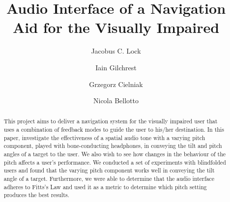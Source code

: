 \documentclass[format=sigconf, review=true, screen=true, anonymous=true]{acmart}
\begin{document}

\title[Audio Interface for the Visually Impaired]{Audio Interface of a Navigation Aid for the Visually Impaired}

\author{Jacobus C. Lock}

\author{Iain Gilchrest}

\author{Grzegorz Cielniak}

\author{Nicola Bellotto}




\begin{abstract}
  This project aims to deliver a navigation system for the visually impaired user that uses a combination of feedback modes to guide the user to his/her destination. In this paper, investigate the effectiveness of a spatial audio tone with a varying pitch component, played with bone-conducting headphones, in conveying the tilt and pitch angles of a target to the user. We also wish to see how changes in the behaviour of the pitch affects a user's performance. We conducted a set of experiments with blindfolded users and found that the varying pitch component works well in conveying the tilt angle of a target. Furthermore, we were able to determine that the audio interface adheres to Fitts's Law and used it as a metric to determine which pitch setting produces the best results. 
\end{abstract}
\end{document}
